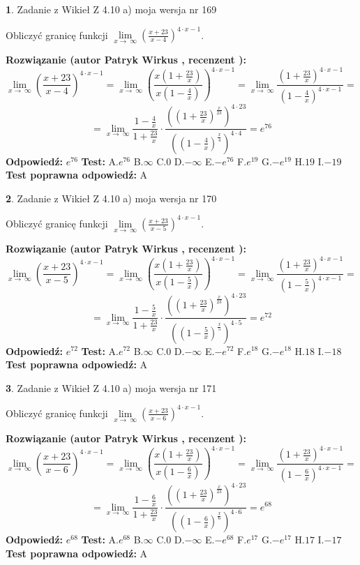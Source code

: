 \documentclass[12pt, a4paper]{article}
\theoremstyle{definition} %
\newtheorem{zad}{}
\newcommand{\zadStart}[1]{\begin{zad}#1\newline}
\newcommand{\zadStop}{\end{zad}}
\newcommand{\rozwStart}[2]{\noindent \textbf{Rozwiązanie (autor #1 , recenzent #2): }\newline}
\newcommand{\rozwStop}{\newline}
\newcommand{\odpStart}{\noindent \textbf{Odpowiedź:}\newline}
\newcommand{\odpStop}{\newline}
\newcommand{\testStart}{\noindent \textbf{Test:}\newline}
\newcommand{\testStop}{\newline}
\newcommand{\kluczStart}{\noindent \textbf{Test poprawna odpowiedź:}\newline}
\newcommand{\kluczStop}{\newline}
\begin{document}
\zadStart{Zadanie z Wikieł Z 4.10 a) moja wersja nr 169}

Obliczyć granicę funkcji  $\lim\limits_{x\to\ \infty}(\frac{x+23}{x-4})^{4\cdot x-1}$.
\zadStop
\rozwStart{Patryk Wirkus}{}
$$\lim\limits_{x\to\ \infty}(\frac{x+23}{x-4})^{4\cdot x-1} = \lim\limits_{x\to\ \infty}(\frac{x(1+\frac{23}{x})}{x(1-\frac{4}{x})})^{4\cdot x-1}=\lim\limits_{x\to\ \infty}\frac{(1+\frac{23}{x})^{4\cdot x-1}}{(1-\frac{4}{x})^{4\cdot x-1}}=$$
$$=\lim\limits_{x\to\ \infty}\frac{1-\frac{4}{x}}{1+\frac{23}{x}}\cdot\frac{((1+\frac{23}{x})^{\frac{x}{23}})^{4\cdot23}}{((1-\frac{4}{x})^{\frac{x}{4}})^{4\cdot4}}=e^{76}$$
\rozwStop
\odpStart
$e^{76}$
\odpStop
\testStart
A.$e^{76}$ B.$\infty$ C.$0$ D.$-\infty$ E.$-e^{76}$
F.$e^{19}$ G.$-e^{19}$
H.$19$
I.$-19$
\testStop
\kluczStart
A
\kluczStop



\zadStart{Zadanie z Wikieł Z 4.10 a) moja wersja nr 170}

Obliczyć granicę funkcji  $\lim\limits_{x\to\ \infty}(\frac{x+23}{x-5})^{4\cdot x-1}$.
\zadStop
\rozwStart{Patryk Wirkus}{}
$$\lim\limits_{x\to\ \infty}(\frac{x+23}{x-5})^{4\cdot x-1} = \lim\limits_{x\to\ \infty}(\frac{x(1+\frac{23}{x})}{x(1-\frac{5}{x})})^{4\cdot x-1}=\lim\limits_{x\to\ \infty}\frac{(1+\frac{23}{x})^{4\cdot x-1}}{(1-\frac{5}{x})^{4\cdot x-1}}=$$
$$=\lim\limits_{x\to\ \infty}\frac{1-\frac{5}{x}}{1+\frac{23}{x}}\cdot\frac{((1+\frac{23}{x})^{\frac{x}{23}})^{4\cdot23}}{((1-\frac{5}{x})^{\frac{x}{5}})^{4\cdot5}}=e^{72}$$
\rozwStop
\odpStart
$e^{72}$
\odpStop
\testStart
A.$e^{72}$ B.$\infty$ C.$0$ D.$-\infty$ E.$-e^{72}$
F.$e^{18}$ G.$-e^{18}$
H.$18$
I.$-18$
\testStop
\kluczStart
A
\kluczStop



\zadStart{Zadanie z Wikieł Z 4.10 a) moja wersja nr 171}

Obliczyć granicę funkcji  $\lim\limits_{x\to\ \infty}(\frac{x+23}{x-6})^{4\cdot x-1}$.
\zadStop
\rozwStart{Patryk Wirkus}{}
$$\lim\limits_{x\to\ \infty}(\frac{x+23}{x-6})^{4\cdot x-1} = \lim\limits_{x\to\ \infty}(\frac{x(1+\frac{23}{x})}{x(1-\frac{6}{x})})^{4\cdot x-1}=\lim\limits_{x\to\ \infty}\frac{(1+\frac{23}{x})^{4\cdot x-1}}{(1-\frac{6}{x})^{4\cdot x-1}}=$$
$$=\lim\limits_{x\to\ \infty}\frac{1-\frac{6}{x}}{1+\frac{23}{x}}\cdot\frac{((1+\frac{23}{x})^{\frac{x}{23}})^{4\cdot23}}{((1-\frac{6}{x})^{\frac{x}{6}})^{4\cdot6}}=e^{68}$$
\rozwStop
\odpStart
$e^{68}$
\odpStop
\testStart
A.$e^{68}$ B.$\infty$ C.$0$ D.$-\infty$ E.$-e^{68}$
F.$e^{17}$ G.$-e^{17}$
H.$17$
I.$-17$
\testStop
\kluczStart
A
\kluczStop
\end{document}
